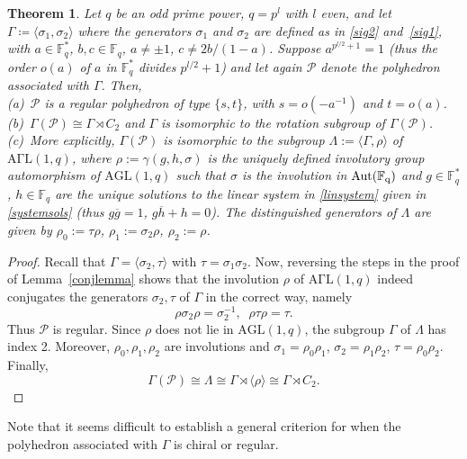 \documentclass[12pt]{article}
\newtheorem{theorem}{Theorem}[section]
\theoremstyle{definition}\newtheorem{definition}{Definition}[section]
\begin{document}
\begin{theorem}
\label{propsubgroup}
Let $q$ be an odd prime power, $q=p^l$ with $l$ even, and let $\Gamma\coloneqq \langle \sigma_1,\sigma_2\rangle$ where the generators $\sigma_1$ and $\sigma_2$ are defined as in \eqref{sig2} and~\eqref{sig1}, with $a\in\mathbb{F}_q^*$, $b,c\in\mathbb{F}_q$, $a\neq \pm 1$, $c\neq 2b/(1-a)$. Suppose $a^{p^{l/2} +1}=1$ (thus the order $o(a)$ of $a$ in $\mathbb{F}_q^*$ divides $p^{l/2} +1$) and let again $\mathcal{P}$ denote the polyhedron associated with $\Gamma$. 
Then, \\[.03in]
(a)\ $\mathcal{P}$ is a regular polyhedron of type $\{s,t\}$, with $s=o(-a^{-1})$ and $t=o(a)$.\\[.03in]
(b)\ $\Gamma(\mathcal{P})\cong \Gamma\rtimes C_2$ and $\Gamma$ is isomorphic to the rotation subgroup of $\Gamma(\mathcal{P})$.\\[.03in]
(c)\ More explicitly, $\Gamma(\mathcal{P})$ is isomorphic to the subgroup $\Lambda:=\langle\Gamma,\rho\rangle$ of $\mathrm{A\Gamma L}(1,q)$, where $\rho:=\gamma(g,h,\sigma)$ is the uniquely defined involutory group automorphism of $\mathrm{AGL}(1,q)$ such that $\sigma$ is the involution in $\rm{Aut}(\mathbb{F}_q)$ and $g\in\mathbb{F}_q^*$, $h\in\mathbb{F}_q$ are the unique solutions to the linear system in \eqref{linsystem} given in \eqref{systemsols} (thus $g\overline{g}= 1$, $g\overline{h}+h=0$). The distinguished generators of $\Lambda$ are given by $\rho_{0}:=\tau\rho$, $\rho_{1}:=\sigma_2\rho$, $\rho_{2}:=\rho$.
\end{theorem}

\begin{proof}
Recall that $\Gamma=\langle\sigma_2,\tau\rangle$ with $\tau=\sigma_1\sigma_2$. Now, reversing the steps in the proof of Lemma~\ref{conjlemma} shows that the involution $\rho$ of $\mathrm{A\Gamma L}(1,q)$ indeed conjugates the generators $\sigma_2,\tau$ of $\Gamma$ in the correct way, namely
\[\rho \sigma_2\rho = \sigma_2^{-1},\;\; \rho\tau\rho=\tau.\] 
Thus $\mathcal{P}$ is regular. Since $\rho$ does not lie in $\mathrm{AGL}(1,q)$, the subgroup $\Gamma$ of $\Lambda$ has index 2. Moreover, $\rho_0,\rho_1,\rho_2$ are involutions and $\sigma_1=\rho_0\rho_1$, $\sigma_2=\rho_1\rho_2$, $\tau = \rho_0\rho_2$. Finally,
\[\Gamma(\mathcal{P})\cong \Lambda\cong\Gamma\rtimes\langle\rho\rangle\cong\Gamma\rtimes C_2.\]
\end{proof}
\smallskip

Note that it seems difficult to establish a general criterion for when the polyhedron associated with $\Gamma$ is chiral or regular. 
\end{document}
